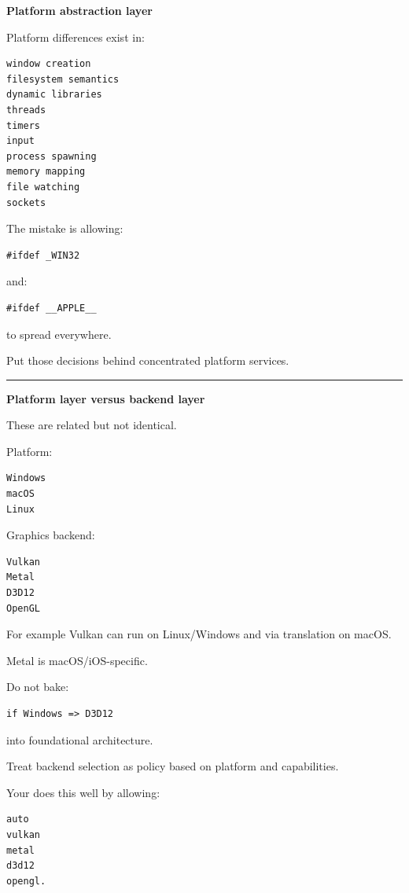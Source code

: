 \textbf{Platform abstraction layer}

Platform differences exist in:

\begin{verbatim}
window creation
filesystem semantics
dynamic libraries
threads
timers
input
process spawning
memory mapping
file watching
sockets
\end{verbatim}

The mistake is allowing:

\begin{verbatim}
#ifdef _WIN32
\end{verbatim}

and:

\begin{verbatim}
#ifdef __APPLE__
\end{verbatim}

to spread everywhere.

Put those decisions behind concentrated platform services.

\begin{center}\rule{0.5\linewidth}{0.5pt}\end{center}

\textbf{Platform layer versus backend layer}

These are related but not identical.

Platform:

\begin{verbatim}
Windows
macOS
Linux
\end{verbatim}

Graphics backend:

\begin{verbatim}
Vulkan
Metal
D3D12
OpenGL
\end{verbatim}

For example Vulkan can run on Linux/Windows and via translation on macOS.

Metal is macOS/iOS-specific.

Do not bake:

\begin{verbatim}
if Windows => D3D12
\end{verbatim}

into foundational architecture.

Treat backend selection as policy based on platform and capabilities.

Your  does this well by allowing:

\begin{verbatim}
auto
vulkan
metal
d3d12
opengl.
\end{verbatim}

